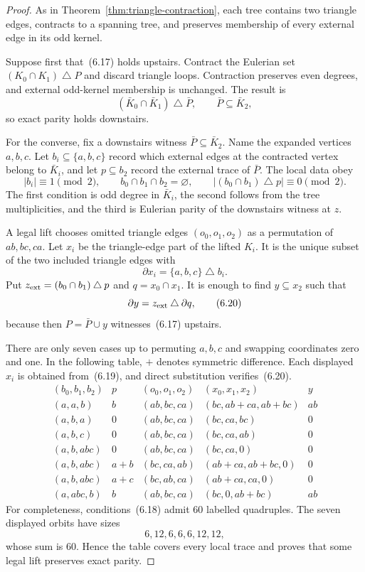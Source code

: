 \documentclass[11pt]{article}
\theoremstyle{definition}
\theoremstyle{remark}
\newcommand{\symdiff}{\mathbin{\triangle}}
\newcommand{\1}{\mathbf 1}
\begin{document}
\begin{proof}
As in Theorem~\ref{thm:triangle-contraction}, each tree contains two
triangle edges, contracts to a spanning tree, and preserves membership of
every external edge in its odd kernel.

Suppose first that~(6.17) holds upstairs.  Contract the Eulerian set
\((K_0\cap K_1)\symdiff P\) and discard triangle loops.  Contraction
preserves even degrees, and external odd-kernel membership is unchanged.
The result is
\[
 (\bar K_0\cap\bar K_1)\symdiff\bar P,
 \qquad \bar P\subseteq\bar K_2,
\]
so exact parity holds downstairs.

For the converse, fix a downstairs witness
\(\bar P\subseteq\bar K_2\).  Name the expanded vertices \(a,b,c\).
Let \(b_i\subseteq\{a,b,c\}\) record which external edges at the contracted
vertex belong to \(\bar K_i\), and let \(p\subseteq b_2\) record the
external trace of \(\bar P\).  The local data obey
\[
 |b_i|\equiv1\pmod2,\qquad
 b_0\cap b_1\cap b_2=\varnothing,\qquad
 |(b_0\cap b_1)\symdiff p|\equiv0\pmod2.                 \tag{6.18}
\]
The first condition is odd degree in \(\bar K_i\), the second follows
from the tree multiplicities, and the third is Eulerian parity of the
downstairs witness at \(z\).

A legal lift chooses omitted triangle edges
\((o_0,o_1,o_2)\) as a permutation of \(ab,bc,ca\).  Let \(x_i\) be the
triangle-edge part of the lifted \(K_i\).  It is the unique subset of the
two included triangle edges with
\[
 \partial x_i=\{a,b,c\}\symdiff b_i.                    \tag{6.19}
\]
Put \(z_{\rm ext}=(b_0\cap b_1)\symdiff p\) and
\(q=x_0\cap x_1\).  It is enough to find \(y\subseteq x_2\) such that
\[
 \partial y=z_{\rm ext}\symdiff\partial q,              \tag{6.20}
\]
because then \(P=\bar P\cup y\) witnesses~(6.17) upstairs.

There are only seven cases up to permuting \(a,b,c\) and swapping
coordinates zero and one.  In the following table, \(+\) denotes symmetric
difference.  Each displayed \(x_i\) is obtained from~(6.19), and direct
substitution verifies~(6.20).
\[
\begin{array}{c|c|c|c|c}
(b_0,b_1,b_2)&p&(o_0,o_1,o_2)&(x_0,x_1,x_2)&y\\ \hline
(a,a,b)&b&(ab,bc,ca)&(bc,ab{+}ca,ab{+}bc)&ab\\
(a,b,a)&0&(ab,bc,ca)&(bc,ca,bc)&0\\
(a,b,c)&0&(ab,bc,ca)&(bc,ca,ab)&0\\
(a,b,abc)&0&(ab,bc,ca)&(bc,ca,0)&0\\
(a,b,abc)&a{+}b&(bc,ca,ab)&(ab{+}ca,ab{+}bc,0)&0\\
(a,b,abc)&a{+}c&(bc,ab,ca)&(ab{+}ca,ca,0)&0\\
(a,abc,b)&b&(ab,bc,ca)&(bc,0,ab{+}bc)&ab
\end{array}                                             \tag{6.21}
\]
For completeness, conditions~(6.18) admit \(60\) labelled quadruples.
The seven displayed orbits have sizes
\[
                     6,12,6,6,6,12,12,
\]
whose sum is \(60\).  Hence the table covers every local trace and proves
that some legal lift preserves exact parity.
\end{proof}
\end{document}
